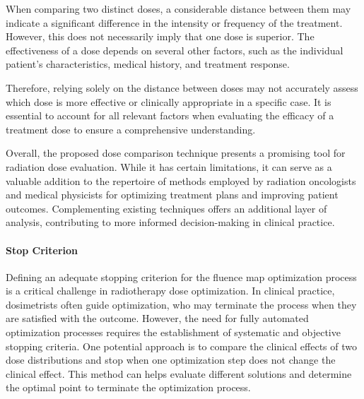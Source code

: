 When comparing two distinct doses, a considerable distance between them may indicate a significant difference in the intensity or frequency of the treatment.
However, this does not necessarily imply that one dose is superior.
The effectiveness of a dose depends on several other factors, such as the individual patient’s characteristics, medical history, and treatment response. 

Therefore, relying solely on the distance between doses may not accurately assess which dose is more effective or clinically appropriate in a specific case.
It is essential to account for all relevant factors when evaluating the efficacy of a treatment dose to ensure a comprehensive understanding.

Overall, the proposed dose comparison technique presents a promising tool for radiation dose evaluation.
While it has certain limitations, it can serve as a valuable addition to the repertoire of methods employed by radiation oncologists and medical physicists for optimizing treatment plans and improving patient outcomes.
Complementing existing techniques offers an additional layer of analysis, contributing to more informed decision-making in clinical practice.

\paragraph{Stop Criterion}
Defining an adequate stopping criterion for the fluence map optimization process is a critical challenge in radiotherapy dose optimization.
In clinical practice, dosimetrists often guide optimization, who may terminate the process when they are satisfied with the outcome.
However, the need for fully automated optimization processes requires the establishment of systematic and objective stopping criteria.
One potential approach is to compare the clinical effects of two dose distributions and stop when one optimization step does not change the clinical effect.
This method can helps evaluate different solutions and determine the optimal point to terminate the optimization process.






